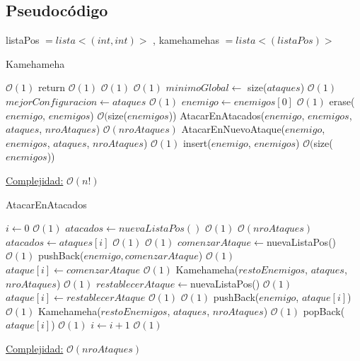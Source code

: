 \documentclass[10pt,a4paper]{article}
\begin{document}
\subsection{Pseudocódigo}
listaPos $= lista<(int,int)>$ , kamehamehas $= lista<(listaPos)>$

\begin{algorithm}
\caption{Kamehameha}
\begin{algorithmic}
	 \Comment $\mathcal{O}(1)$
		\State return \Comment $\mathcal{O}(1)$
	\EndIf
	 \Comment $\mathcal{O}(1)$
		\Comment $\mathcal{O}(1)$
			\State $minimoGlobal \gets$ size($ataques$) \Comment $\mathcal{O}(1)$ 		
			\State $mejorConfiguracion \gets ataques$ \Comment $\mathcal{O}(1)$
		\EndIf
	\Else
		\State $enemigo \gets enemigos[0]$ \Comment $\mathcal{O}(1)$
		\State erase($enemigo$, $enemigos$) \Comment $\mathcal{O}($size($enemigos$))
		\State AtacarEnAtacados($enemigo$, $enemigos$, $ataques$, $nroAtaques$)	\Comment $\mathcal{O}(nroAtaques)$
		\State AtacarEnNuevoAtaque($enemigo$, $enemigos$, $ataques$, $nroAtaques$) \Comment $\mathcal{O}(1)$
		\State insert($enemigo$, $enemigos$) \Comment $\mathcal{O}($size($enemigos$))
\EndIf
\EndFunction
\end{algorithmic}
\underline{Complejidad:} $\mathcal{O}(n!)$\\
    
\end{algorithm}

\begin{algorithm}
\caption{AtacarEnAtacados}
\begin{algorithmic}
\State $i \gets 0$ \Comment $\mathcal{O}(1)$
\State $atacados \gets nuevaListaPos()$ \Comment $\mathcal{O}(1)$
 \Comment $\mathcal{O}(nroAtaques)$
	\State $atacados \gets ataques[i]$ \Comment $\mathcal{O}(1)$
	 \Comment $\mathcal{O}(1)$
		\State $comenzarAtaque \gets $nuevaListaPos() \Comment $\mathcal{O}(1)$
		\State pushBack($enemigo, comenzarAtaque$) \Comment $\mathcal{O}(1)$
		\State $ataque[i] \gets 	comenzarAtaque$ \Comment $\mathcal{O}(1)$
		\State Kamehameha($restoEnemigos$, $ataques$, $nroAtaques$) \Comment $\mathcal{O}(1)$
		\State $restablecerAtaque \gets $nuevaListaPos() \Comment $\mathcal{O}(1)$
		\State $ataque[i] \gets 	restablecerAtaque$ \Comment $\mathcal{O}(1)$
	 \Comment $\mathcal{O}(1)$
		\State pushBack($enemigo$, $ataque[i]$) \Comment $\mathcal{O}(1)$
		\State Kamehameha($restoEnemigos$, $ataques$, $nroAtaques$) \Comment $\mathcal{O}(1)$
		\State popBack($ataque[i]$) \Comment $\mathcal{O}(1)$
	\EndIf
	\State $i \gets i + 1$ \Comment $\mathcal{O}(1)$
\EndWhile
\EndFunction
\end{algorithmic}
\underline{Complejidad:} $\mathcal{O}(nroAtaques)$\\
    
\end{algorithm}
 \newpage
\end{document}
